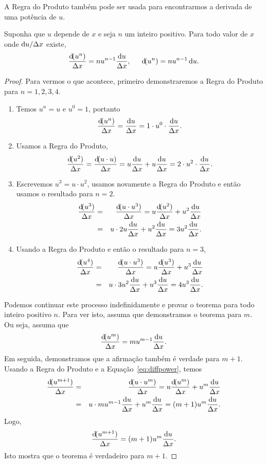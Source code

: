 A Regra do Produto também pode ser usada para encontrarmos a derivada de
uma potência de $u$.

\begin{theorem}
\label{teo:diffpower}
Suponha que $u$ depende de $x$ e seja $n$ um inteiro positivo. Para todo
valor de $x$ onde $\du/\dx$ existe,
$$
  \frac{\dif(u^n)}{\dx} = n u^{n-1} \frac{\du}{\dx},
  \hspace{1.5em}
  \dif(u^n) = n u^{n-1} \du.
$$
\end{theorem}

\begin{proof}
Para vermos o que acontece, primeiro demonstraremos a Regra do Produto
para $n = 1, 2, 3, 4$.
\begin{enumerate}[$n =$ 1:]
\item Temos $u^n = u$ e $u^0 = 1$, portanto
$$
  \frac{\dif(u^n)}{\dx} = \frac{\du}{\dx} = 1 \cdot u^0 \cdot \frac{\du}{\dx}.
$$
\item Usamos a Regra do Produto,
$$
  \frac{\dif(u^2)}{\dx} = \frac{\dif(u \cdot u)}{\dx} = u \frac{\du}{\dx} + u \frac{\du}{\dx} = 2 \cdot u^2 \cdot \frac{\du}{\dx}.
$$
\item Escrevemos $u^3 = u \cdot u^2$, usamos novamente a Regra do Produto e
      então usamos o resultado para $n = 2$.
\begin{eqnarray*}
  \frac{\dif(u^3)}{\dx} & = & \frac{\dif(u \cdot u^3)}{\dx} =
    u \frac{\dif(u^2)}{\dx} + u^2 \frac{\du}{\dx} \\
  & = & u \cdot 2u \frac{\du}{\dx} + u^2 \frac{\du}{\dx} =
    3 u^2 \frac{\du}{\dx}.
\end{eqnarray*}
\item Usando a Regra do Produto e então o resultado para $n = 3$,
\begin{eqnarray*}
  \frac{\dif(u^4)}{\dx} & = & \frac{\dif(u \cdot u^3)}{\dx} =
    u \frac{\dif(u^3)}{\dx} + u^3 \frac{\du}{\dx} \\
  & = & u \cdot 3u^2 \frac{\du}{\dx} + u^3 \frac{\du}{\dx} =
    4 u^3 \frac{\du}{\dx}.
\end{eqnarray*}
\end{enumerate}
Podemos continuar este processo indefinidamente e provar o teorema para
todo inteiro positivo $n$. Para ver isto, assuma que demonstramos o teorema
para $m$. Ou seja, assuma que
\begin{eqnarray}
  \frac{\dif(u^m)}{\dx} = m u^{m-1} \frac{\du}{\dx}. \label{eq:diffpower}
\end{eqnarray}
Em seguida, demonstramos que a afirmação também é verdade para $m+1$. Usando
a Regra do Produto e a Equação~\ref{eq:diffpower}, temos
\begin{eqnarray*}
  \frac{\dif(u^{m+1})}{\dx} & = & \frac{\dif(u \cdot u^m)}{\dx} =
    u \frac{\dif(u^m)}{\dx} + u^m \frac{\du}{\dx} \\
  & = & u \cdot m u^{m-1} \frac{\du}{\dx} + u^m \frac{\du}{\dx} =
    (m + 1)u^m \frac{\du}{\dx}.
\end{eqnarray*}
Logo,
$$
  \frac{\dif(u^{m+1})}{\dx} = (m + 1)u^m \frac{\du}{\dx}.
$$
Isto mostra que o teorema é verdadeiro para $m + 1$.


\end{proof}
